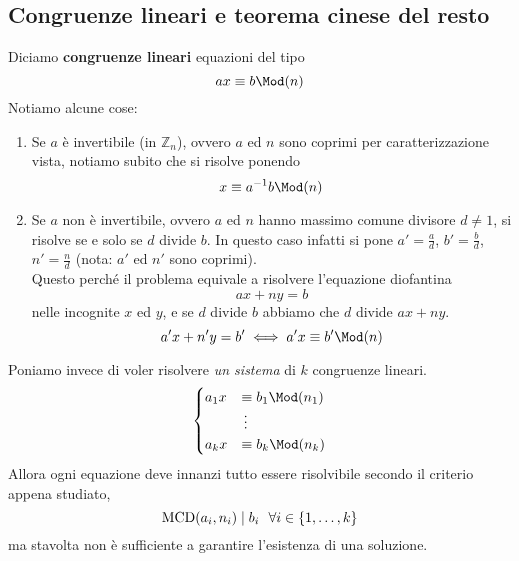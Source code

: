 \subsection{Congruenze lineari e teorema cinese del resto}
Diciamo \textbf{congruenze lineari} equazioni del tipo
\begin{equation*}
ax\equiv b\Mod(n)
\end{equation*}
Notiamo alcune cose:
\begin{enumerate}
	\item Se $a$ è invertibile (in $\mathbb{Z}_n$), ovvero $a$ ed $n$ sono coprimi per caratterizzazione vista, notiamo subito che si risolve ponendo
	\begin{equation*}
	x\equiv a^{-1}b\Mod(n)
	\end{equation*}
	\item Se $a$ non è invertibile, ovvero $a$ ed $n$ hanno massimo comune divisore $d\neq1$, si risolve se e solo se $d$ divide $b$. In questo caso infatti si pone $a'=\frac{a}{d}$, $b'=\frac{b}{d}$, $n'=\frac{n}{d}$ (nota: $a'$ ed $n'$ sono coprimi).\\
	Questo perché il problema equivale a risolvere l'equazione diofantina 
	\begin{equation*}
	ax+ny=b
	\end{equation*}
	nelle incognite $x$ ed $y$, e se $d$ divide $b$ abbiamo che $d$ divide $ax+ny$.
	\begin{equation*}
	a'x+n'y=b' \iff a'x\equiv b'\Mod(n)
	\end{equation*}
\end{enumerate}
Poniamo invece di voler risolvere \textit{un sistema} di $k$ congruenze lineari.
\begin{equation*}
\begin{cases}
a_1x&\equiv b_1\Mod(n_1)\\
&\,\vdots\\
a_kx&\equiv b_k\Mod(n_k)
\end{cases}
\end{equation*}
Allora ogni equazione deve innanzi tutto essere risolvibile secondo il criterio appena studiato, 
\begin{equation*}
\operatorname{\mathrm{MCD}}(a_i,n_i)\mid b_i \ \ \forall i \in \left\{1, \dots, k\right\}
\end{equation*}
ma stavolta non è sufficiente a garantire l'esistenza di una soluzione.
